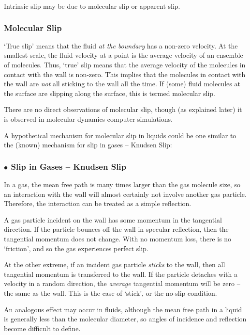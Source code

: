 \documentclass[12pt, a4paper, twoside, openright]{book}
\begin{document}
Intrinsic slip may be due to molecular slip or apparent slip.


\subsubsection*{Molecular Slip}
`True slip' means that the fluid \emph{at the boundary} has a non-zero velocity.
At the smallest scale, the fluid velocity at a point is the average velocity of an ensemble of molecules.  Thus, `true' slip means that the average velocity of the molecules in contact with the wall is non-zero.
This implies that the molecules in contact with the wall are \emph{not} all sticking to the wall all the time.
If (some) fluid molecules at the surface are slipping along the surface, this is termed molecular slip.

There are no direct observations of molecular slip, though (as explained later) it is observed in molecular dynamics computer simulations.

A hypothetical mechanism for molecular slip in liquids could be one similar to the (known) mechanism for slip in gases -- Knudsen Slip:


\subsubsection*{$\bullet$ Slip in Gases -- Knudsen Slip}
In a gas, the mean free path is many times larger than the gas molecule size, so an interaction with the wall will almost certainly not involve another gas particle.  Therefore, the interaction can be treated as a simple reflection.

A gas particle incident on the wall has some momentum in the tangential direction.  If the particle bounces off the wall in specular reflection, then the tangential momentum does not change.  With no momentum loss, there is no `friction', and so the gas experiences perfect slip.  

At the other extreme, if an incident gas particle \emph{sticks} to the wall,
then all tangential momentum is transferred to the wall.  If the particle detaches with a velocity in a random direction, the \emph{average} tangential momentum will be zero -- the same as the wall.  This is the case of `stick', or the no-slip condition.

An analogous effect may occur in fluids, although the mean free path in a liquid is generally less than the molecular diameter, so angles of incidence and reflection become difficult to define.
\end{document}
